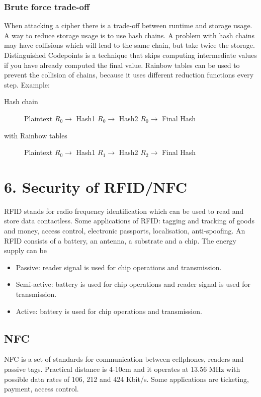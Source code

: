 \documentclass{article}
\begin{document}
\subsubsection*{Brute force trade-off}
When attacking a cipher there is a trade-off between runtime and storage usage. A way to reduce storage usage is to use hash chains. A problem with hash chains may have collisions which will lead to the same chain, but take twice the storage. Distinguished Codepoints is a technique that skips computing intermediate values if you have already computed the final value. Rainbow tables can be used to prevent the collision of chains, because it uses different reduction functions every step. Example:

\begin{description}
\item[Hash chain] Plaintext $R_0 \rightarrow$ Hash1 $R_0 \rightarrow$ Hash2 $R_0 \rightarrow$ Final Hash
\item[with Rainbow tables] Plaintext $R_0 \rightarrow$ Hash1 $R_1 \rightarrow$ Hash2 $R_2 \rightarrow$ Final Hash
\end{description}

\section*{6. Security of RFID/NFC}
RFID stands for radio frequency identification which can be used to read and store data contactless. Some applications of RFID: tagging and tracking of goods and money, access control, electronic passports, localisation, anti-spoofing. An RFID consists of a battery, an antenna, a substrate and a chip. The energy supply can be

\begin{itemize}
\item Passive: reader signal is used for chip operations and transmission.
\item Semi-active: battery is used for chip operations and reader signal is used for transmission.
\item Active: battery is used for chip operations and transmission.
\end{itemize}

\subsection*{NFC}
NFC is a set of standards for communication between cellphones, readers and passive tags. Practical distance is 4-10cm and it operates at 13.56 MHz with possible data rates of 106, 212 and 424 Kbit/s. Some applications are ticketing, payment, access control.
\end{document}
